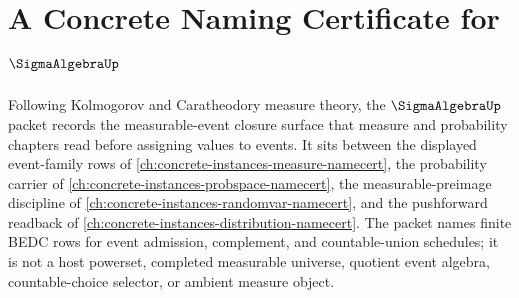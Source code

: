 \chapter{A Concrete Naming Certificate for $\SigmaAlgebraUp$}
\label{ch:concrete-instances-sigma-algebra-namecert}

Following Kolmogorov and Caratheodory measure theory, the $\SigmaAlgebraUp$ packet records the measurable-event closure surface that measure and probability chapters read before assigning values to events. It sits between the displayed event-family rows of \autoref{ch:concrete-instances-measure-namecert}, the probability carrier of \autoref{ch:concrete-instances-probspace-namecert}, the measurable-preimage discipline of \autoref{ch:concrete-instances-randomvar-namecert}, and the pushforward readback of \autoref{ch:concrete-instances-distribution-namecert}. The packet names finite BEDC rows for event admission, complement, and countable-union schedules; it is not a host powerset, completed measurable universe, quotient event algebra, countable-choice selector, or ambient measure object.

